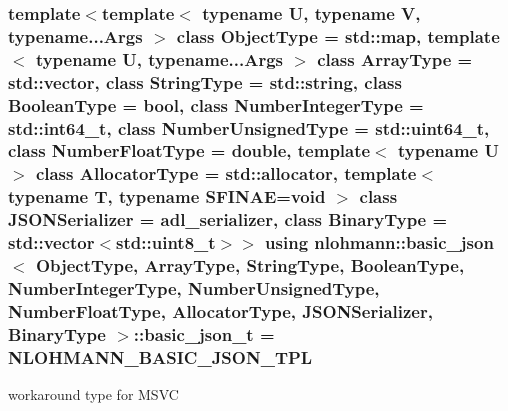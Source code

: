 \subsubsection[{\texorpdfstring{basic\+\_\+json\+\_\+t}{basic_json_t}}]{\setlength{\rightskip}{0pt plus 5cm}template$<$template$<$ typename U, typename V, typename...\+Args $>$ class Object\+Type = std\+::map, template$<$ typename U, typename...\+Args $>$ class Array\+Type = std\+::vector, class String\+Type  = std\+::string, class Boolean\+Type  = bool, class Number\+Integer\+Type  = std\+::int64\+\_\+t, class Number\+Unsigned\+Type  = std\+::uint64\+\_\+t, class Number\+Float\+Type  = double, template$<$ typename U $>$ class Allocator\+Type = std\+::allocator, template$<$ typename T, typename S\+F\+I\+N\+A\+E=void $>$ class J\+S\+O\+N\+Serializer = adl\+\_\+serializer, class Binary\+Type  = std\+::vector$<$std\+::uint8\+\_\+t$>$$>$ using {\bf nlohmann\+::basic\+\_\+json}$<$ Object\+Type, Array\+Type, String\+Type, Boolean\+Type, Number\+Integer\+Type, Number\+Unsigned\+Type, Number\+Float\+Type, Allocator\+Type, J\+S\+O\+N\+Serializer, Binary\+Type $>$\+::{\bf basic\+\_\+json\+\_\+t} =  {\bf N\+L\+O\+H\+M\+A\+N\+N\+\_\+\+B\+A\+S\+I\+C\+\_\+\+J\+S\+O\+N\+\_\+\+T\+PL}\hspace{0.3cm}{\ttfamily [private]}}\hypertarget{classnlohmann_1_1basic__json_a125c0afa5f3599949b0589ef7b4aa322}{}\label{classnlohmann_1_1basic__json_a125c0afa5f3599949b0589ef7b4aa322}


workaround type for M\+S\+VC 

